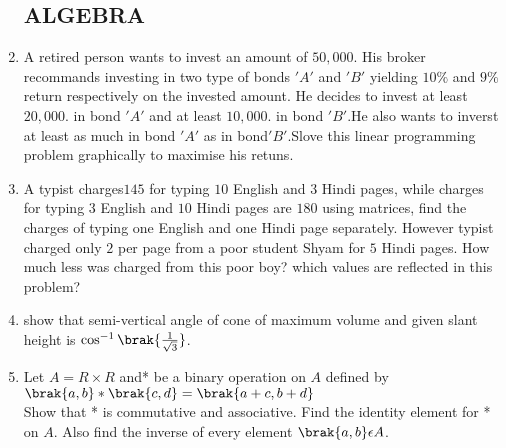 \documentclass[12pt, -letter paper]{article}
\begin{document}
\begin{enumerate}
     \subsection*{ALGEBRA}


  \item A retired person wants to invest an amount of \rupee$50,000$. His broker recommands investing in two type of bonds $'A'$ and $'B'$ yielding $10\%$ and $9\%$ return respectively on the invested amount. He decides to invest at least\rupee$20,000$. in bond $'A'$ and at least \rupee$10,000$. in bond $'B'$.He also wants to inverst at least as much in bond $'A'$ as in bond$'B'$.Slove this linear programming problem graphically to maximise his retuns.

\item A typist charges\rupee$145$ for typing $10$ English and    $3$ Hindi pages, while charges for typing $3$ English and $10$ Hindi pages are \rupee$180$ using matrices, find the charges of typing one English and one Hindi page separately. However typist charged only \rupee$2$  per page from a poor student Shyam for $5$ Hindi pages. How much less was charged from this poor boy? which values are reflected in this problem?
  



	  \item  show that semi-vertical angle of cone of maximum volume and given slant height is  $\cos^{-1}\brak{\frac{1}{\sqrt{3}}}$.
     
  \item Let $A=R\times R$ and* be a binary operation on $A$ defined by\\ $\brak{a,b}*\brak{c,d}=\brak{a+c,b+d}$\\
	  Show that * is commutative and associative. Find the identity element for * on $A$. Also find the inverse of every element $\brak{a,b}\epsilon A$.

 

\end{enumerate}        
\end{document}
